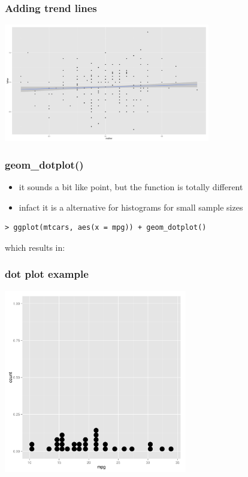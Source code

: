 \documentclass[xcolor={table}]{beamer}
\begin{document}
\begin{frame}\frametitle{Adding trend lines}
  \begin{center}
    \includegraphics[width=9cm]{scattertrend2.png}
  \end{center}
\end{frame}


\begin{frame}[fragile]\frametitle{geom\_dotplot()}
  \begin{itemize}
  \item it sounds a bit like point, but the function is totally different
  \item infact it is a alternative for histograms for small sample sizes
  \end{itemize}\small
\begin{verbatim}
> ggplot(mtcars, aes(x = mpg)) + geom_dotplot()
\end{verbatim}
which results in:
\end{frame}

\begin{frame}\frametitle{dot plot example}
  \begin{center}
    \includegraphics[width=8cm]{dotplot1.png}
  \end{center}
\end{frame}
\end{document}
